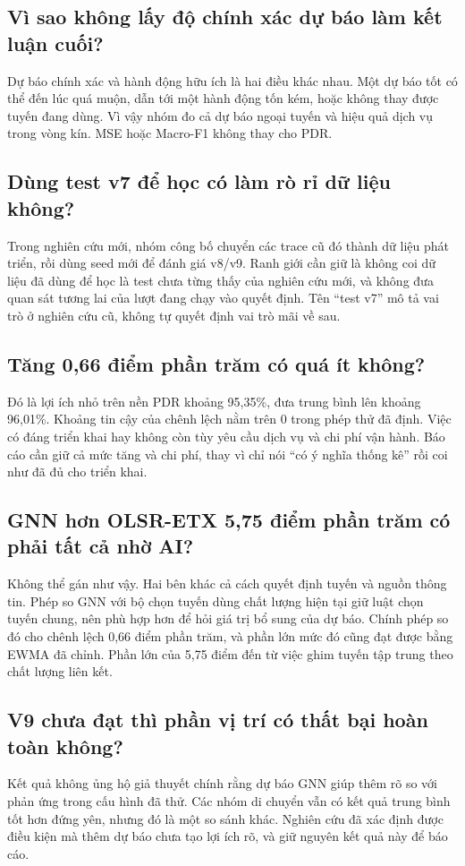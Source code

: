 \subsection*{Vì sao không lấy độ chính xác dự báo làm kết luận cuối?}
Dự báo chính xác và hành động hữu ích là hai điều khác nhau. Một dự báo tốt có thể đến lúc quá muộn, dẫn tới một hành động tốn kém, hoặc không thay được tuyến đang dùng. Vì vậy nhóm đo cả dự báo ngoại tuyến và hiệu quả dịch vụ trong vòng kín. MSE hoặc Macro-F1 không thay cho PDR.

\subsection*{Dùng test v7 để học có làm rò rỉ dữ liệu không?}
Trong nghiên cứu mới, nhóm công bố chuyển các trace cũ đó thành dữ liệu phát triển, rồi dùng seed mới để đánh giá v8/v9. Ranh giới cần giữ là không coi dữ liệu đã dùng để học là test chưa từng thấy của nghiên cứu mới, và không đưa quan sát tương lai của lượt đang chạy vào quyết định. Tên ``test v7'' mô tả vai trò ở nghiên cứu cũ, không tự quyết định vai trò mãi về sau.

\subsection*{Tăng 0,66 điểm phần trăm có quá ít không?}
Đó là lợi ích nhỏ trên nền PDR khoảng 95,35\%, đưa trung bình lên khoảng 96,01\%. Khoảng tin cậy của chênh lệch nằm trên 0 trong phép thử đã định. Việc có đáng triển khai hay không còn tùy yêu cầu dịch vụ và chi phí vận hành. Báo cáo cần giữ cả mức tăng và chi phí, thay vì chỉ nói ``có ý nghĩa thống kê'' rồi coi như đã đủ cho triển khai.

\subsection*{GNN hơn OLSR-ETX 5,75 điểm phần trăm có phải tất cả nhờ AI?}
Không thể gán như vậy. Hai bên khác cả cách quyết định tuyến và nguồn thông tin. Phép so GNN với bộ chọn tuyến dùng chất lượng hiện tại giữ luật chọn tuyến chung, nên phù hợp hơn để hỏi giá trị bổ sung của dự báo. Chính phép so đó cho chênh lệch 0,66 điểm phần trăm, và phần lớn mức đó cũng đạt được bằng EWMA đã chỉnh. Phần lớn của 5,75 điểm đến từ việc ghim tuyến tập trung theo chất lượng liên kết.

\subsection*{V9 chưa đạt thì phần vị trí có thất bại hoàn toàn không?}
Kết quả không ủng hộ giả thuyết chính rằng dự báo GNN giúp thêm rõ so với phản ứng trong cấu hình đã thử. Các nhóm di chuyển vẫn có kết quả trung bình tốt hơn đứng yên, nhưng đó là một so sánh khác. Nghiên cứu đã xác định được điều kiện mà thêm dự báo chưa tạo lợi ích rõ, và giữ nguyên kết quả này để báo cáo.

